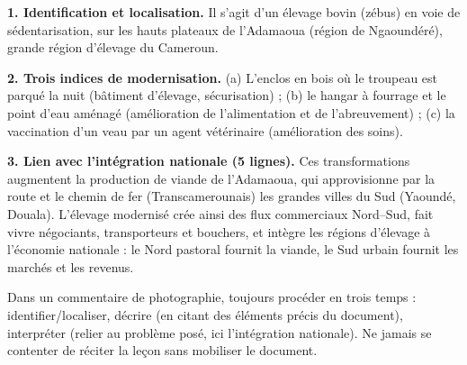 \documentclass[11pt]{article}
\begin{document}
\begin{corrige}
\textbf{1. Identification et localisation.} Il s'agit d'un élevage bovin (zébus) en voie de sédentarisation, sur les hauts plateaux de l'Adamaoua (région de Ngaoundéré), grande région d'élevage du Cameroun.

\textbf{2. Trois indices de modernisation.} (a) L'enclos en bois où le troupeau est parqué la nuit (bâtiment d'élevage, sécurisation) ; (b) le hangar à fourrage et le point d'eau aménagé (amélioration de l'alimentation et de l'abreuvement) ; (c) la vaccination d'un veau par un agent vétérinaire (amélioration des soins).

\textbf{3. Lien avec l'intégration nationale (5 lignes).} Ces transformations augmentent la production de viande de l'Adamaoua, qui approvisionne par la route et le chemin de fer (Transcamerounais) les grandes villes du Sud (Yaoundé, Douala). L'élevage modernisé crée ainsi des flux commerciaux Nord--Sud, fait vivre négociants, transporteurs et bouchers, et intègre les régions d'élevage à l'économie nationale : le Nord pastoral fournit la viande, le Sud urbain fournit les marchés et les revenus.

\begin{attention}
Dans un commentaire de photographie, toujours procéder en trois temps : identifier/localiser, décrire (en citant des éléments précis du document), interpréter (relier au problème posé, ici l'intégration nationale). Ne jamais se contenter de réciter la leçon sans mobiliser le document.
\end{attention}
\end{corrige}
\end{document}
